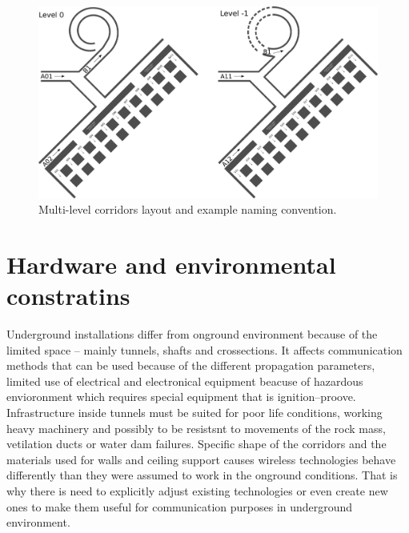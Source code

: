 \documentclass[../main.tex]{subfiles}
\begin{document}
\begin{figure}[ht]
\includegraphics[width=\textwidth]{pictures/mine_with_levels_scheme.pdf}
\centering
\caption{Multi-level corridors layout and example naming convention.}
\label{fig:mine_with_levels_scheme}
\end{figure}


\section{Hardware and environmental constratins} %
\label{sub:hardware_and_environmental_constratins}


Underground installations differ from onground environment because of the limited space -- mainly tunnels, shafts and crossections. It affects communication methods that can be used because of the different propagation parameters, limited use of electrical and electronical equipment beacuse of hazardous envioronment which requires special equipment that is ignition--proove. Infrastructure inside tunnels must be suited for poor life conditions, working heavy machinery and possibly to be resistsnt to movements of the rock mass, vetilation ducts or water dam failures. Specific shape of the corridors and the materials used for walls and ceiling support causes wireless technologies behave differently than they were assumed to work in the onground conditions. That is why there is need to explicitly adjust existing technologies or even create new ones to make them useful for communication purposes in underground environment.
\end{document}
